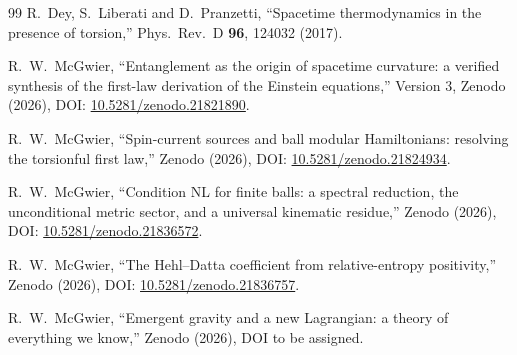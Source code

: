 \documentclass[11pt]{article}
\theoremstyle{definition}
\begin{document}
\begin{thebibliography}{99}
R.~Dey, S.~Liberati and D.~Pranzetti, ``Spacetime thermodynamics in the
presence of torsion,'' Phys.\ Rev.\ D \textbf{96}, 124032 (2017).

R.~W.~McGwier, ``Entanglement as the origin of spacetime curvature: a
verified synthesis of the first-law derivation of the Einstein
equations,'' Version 3, Zenodo (2026), DOI:
\href{https://doi.org/10.5281/zenodo.21821890}{10.5281/zenodo.21821890}.

R.~W.~McGwier, ``Spin-current sources and ball modular Hamiltonians:
resolving the torsionful first law,''
Zenodo (2026), DOI:
\href{https://doi.org/10.5281/zenodo.21824934}{10.5281/zenodo.21824934}.

R.~W.~McGwier, ``Condition NL for finite balls: a spectral reduction, the unconditional metric sector, and a universal kinematic residue,''
Zenodo (2026), DOI:
\href{https://doi.org/10.5281/zenodo.21836572}{10.5281/zenodo.21836572}.

R.~W.~McGwier, ``The Hehl--Datta coefficient from relative-entropy positivity,''
Zenodo (2026), DOI:
\href{https://doi.org/10.5281/zenodo.21836757}{10.5281/zenodo.21836757}.

R.~W.~McGwier, ``Emergent gravity and a new Lagrangian: a theory of everything we know,''
Zenodo (2026), DOI to be assigned.

\end{thebibliography}
\end{document}
